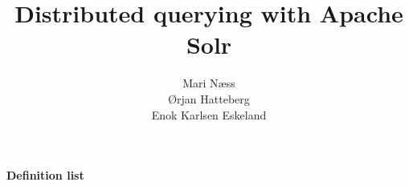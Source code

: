 \documentclass[pdftex,12pt,final,a4paper]{report}
\author{Mari Næss \\
Ørjan Hatteberg \\
Enok Karlsen Eskeland}
\begin{document}
\title{Distributed querying with Apache Solr}
\maketitle







%
%

\tableofcontents 

\listoffigures

\listoftables


\pagebreak
\thispagestyle{plain}
\begin{Huge}
\label{definitions}
\begin{flushleft}

\bf Definition list
\end{flushleft}
\end{Huge}
\end{document}
